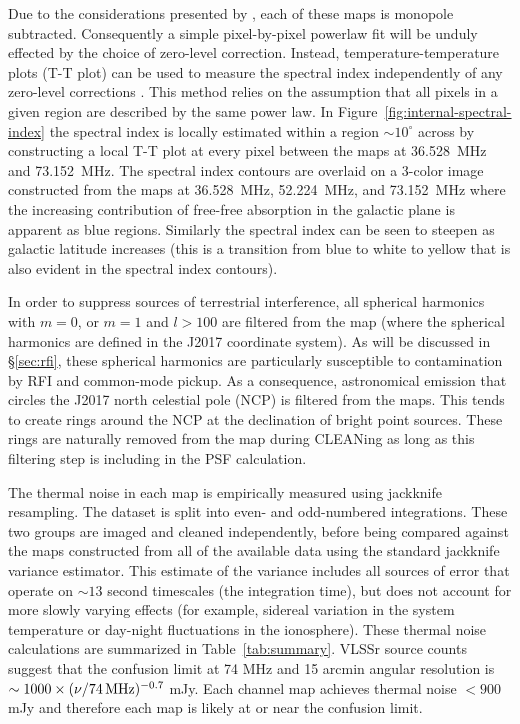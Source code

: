 \documentclass[twocolumn]{aastex61}
\begin{document}
Due to the considerations presented by \citet{2016ApJ...826..116V}, each of these maps is monopole
subtracted. Consequently a simple pixel-by-pixel powerlaw fit will be unduly effected by the choice
of zero-level correction. Instead, temperature-temperature plots (T-T plot) can be used to measure
the spectral index independently of any zero-level corrections \citep{1962MNRAS.124..297T}. This
method relies on the assumption that all pixels in a given region are described by the same power
law. In Figure~\ref{fig:internal-spectral-index} the spectral index is locally estimated within a
region $\sim10^\circ$ across by constructing a local T-T plot at every pixel between the maps at
36.528~MHz and 73.152~MHz. The spectral index contours are overlaid on a 3-color image constructed
from the maps at 36.528~MHz, 52.224~MHz, and 73.152~MHz where the increasing contribution of
free-free absorption in the galactic plane is apparent as blue regions. Similarly the spectral index
can be seen to steepen as galactic latitude increases (this is a transition from blue to white to
yellow that is also evident in the spectral index contours).

In order to suppress sources of terrestrial interference, all spherical harmonics with $m=0$, or
$m=1$ and $l>100$ are filtered from the map (where the spherical harmonics are defined in the J2017
coordinate system). As will be discussed in \S\ref{sec:rfi}, these spherical harmonics are
particularly susceptible to contamination by RFI and common-mode pickup. As a consequence,
astronomical emission that circles the J2017 north celestial pole (NCP) is filtered from the maps.
This tends to create rings around the NCP at the declination of bright point sources. These rings
are naturally removed from the map during CLEANing as long as this filtering step is including in
the PSF calculation.

The thermal noise in each map is empirically measured using jackknife resampling. The dataset is
split into even- and odd-numbered integrations. These two groups are imaged and cleaned
independently, before being compared against the maps constructed from all of the available data
using the standard jackknife variance estimator. This estimate of the variance includes all sources
of error that operate on $\sim13$ second timescales (the integration time), but does not account for
more slowly varying effects (for example, sidereal variation in the system temperature or day-night
fluctuations in the ionosphere). These thermal noise calculations are summarized in
Table~\ref{tab:summary}.  VLSSr source counts \citep{2014MNRAS.440..327L} suggest that the confusion
limit at 74 MHz and 15 arcmin angular resolution is $\sim 1000\times(\nu/74\,{\rm MHz})^{-0.7}$ mJy.
Each channel map achieves thermal noise $<900$ mJy and therefore each map is likely at or near the
confusion limit.
\end{document}
